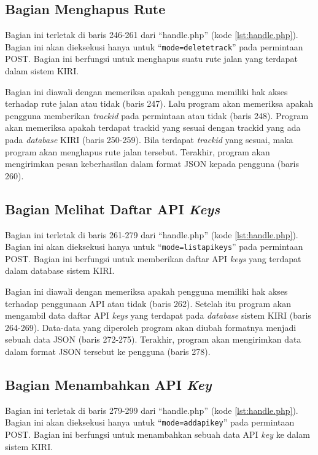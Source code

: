 \subsection{Bagian Menghapus Rute}
\label{sec:hapusrute}
Bagian ini terletak di baris 246-261 dari ``handle.php'' (kode \ref{lst:handle.php}). Bagian ini akan dieksekusi hanya untuk ``\texttt{mode=deletetrack}'' pada permintaan POST. Bagian ini berfungsi untuk menghapus suatu rute jalan yang terdapat dalam sistem KIRI.

Bagian ini diawali dengan memeriksa apakah pengguna memiliki hak akses terhadap rute jalan atau tidak (baris 247). Lalu program akan memeriksa apakah pengguna memberikan \textit{trackid} pada permintaan atau tidak (baris 248). Program akan memeriksa apakah terdapat {trackid} yang sesuai dengan {trackid} yang ada pada \textit{database} KIRI (baris 250-259). Bila terdapat \textit{trackid} yang sesuai, maka program akan menghapus rute jalan tersebut. Terakhir, program akan mengirimkan pesan keberhasilan dalam format JSON kepada pengguna (baris 260).

\subsection{Bagian Melihat Daftar API \textit{Keys}}
\label{sec:lihatapikeys}
Bagian ini terletak di baris 261-279 dari ``handle.php'' (kode \ref{lst:handle.php}). Bagian ini akan dieksekusi hanya untuk ``\texttt{mode=listapikeys}'' pada permintaan POST. Bagian ini berfungsi untuk memberikan daftar API \textit{keys} yang terdapat dalam database sistem KIRI.

Bagian ini diawali dengan memeriksa apakah pengguna memiliki hak akses terhadap penggunaan API atau tidak (baris 262). Setelah itu program akan mengambil data daftar API \textit{keys} yang terdapat pada \textit{database} sistem KIRI (baris 264-269). Data-data yang diperoleh program akan diubah formatnya menjadi sebuah data JSON (baris 272-275). Terakhir, program akan mengirimkan data dalam format JSON tersebut ke pengguna (baris 278).

\subsection{Bagian Menambahkan API \textit{Key}}
\label{sec:tambahapikey}
Bagian ini terletak di baris 279-299 dari ``handle.php'' (kode \ref{lst:handle.php}). Bagian ini akan dieksekusi hanya untuk ``\texttt{mode=addapikey}'' pada permintaan POST. Bagian ini berfungsi untuk menambahkan sebuah data API \textit{key} ke dalam sistem KIRI.

